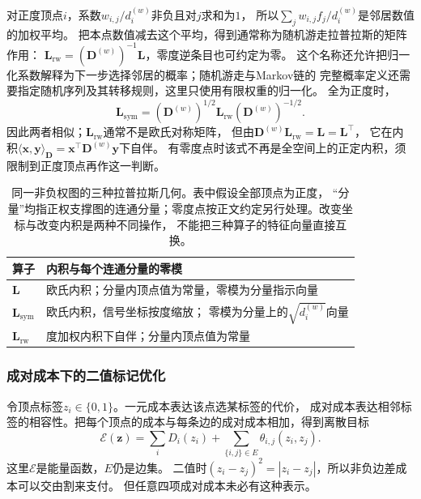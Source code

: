 对正度顶点\(i\)，系数\(w_{i,j}/d_i^{(w)}\)非负且对\(j\)求和为\(1\)，
所以\(\sum_j w_{i,j}f_j/d_i^{(w)}\)是邻居数值的加权平均。
把本点数值减去这个平均，得到通常称为随机游走拉普拉斯的矩阵作用：
\(\bm L_{\mathrm{rw}}=(\bm D^{(w)})^{-1}\bm L\)，零度逆条目也可约定为零。
这个名称还允许把归一化系数解释为下一步选择邻居的概率；随机游走与Markov链的
完整概率定义还需要指定随机序列及其转移规则，这里只使用有限权重的归一化。
全为正度时，
\[
  \bm L_{\mathrm{sym}}
  =(\bm D^{(w)})^{1/2}\bm L_{\mathrm{rw}}(\bm D^{(w)})^{-1/2}.
\]
因此两者相似；\(\bm L_{\mathrm{rw}}\)通常不是欧氏对称矩阵，
但由\(\bm D^{(w)}\bm L_{\mathrm{rw}}=\bm L=\bm L^\top\)，
它在内积\(\langle\bm x,\bm y\rangle_{\bm D}
=\bm x^\top\bm D^{(w)}\bm y\)下自伴。
有零度点时该式不再是全空间上的正定内积，须限制到正度顶点再作这一判断。

\begin{table}[htbp]
  \centering\small
  \begin{tabularx}{\linewidth}{@{}lX@{}}
    \toprule
    算子 & 内积与每个连通分量的零模\\
    \midrule
    \(\bm L\) & 欧氏内积；分量内顶点值为常量，零模为分量指示向量\\
    \(\bm L_{\mathrm{sym}}\) & 欧氏内积，信号坐标按度缩放；
      零模为分量上的\(\sqrt{d_i^{(w)}}\)向量\\
    \(\bm L_{\mathrm{rw}}\) & 度加权内积下自伴；分量内顶点值为常量\\
    \bottomrule
  \end{tabularx}
  \caption{同一非负权图的三种拉普拉斯几何。表中假设全部顶点为正度，
  “分量”均指正权支撑图的连通分量；零度点按正文约定另行处理。改变坐标与改变内积是两种不同操作，
  不能把三种算子的特征向量直接互换。}
  \label{tab:graph-theory-laplacian-geometries}
\end{table}

\subsubsection{成对成本下的二值标记优化}

令顶点标签\(z_i\in\{0,1\}\)。一元成本表达该点选某标签的代价，
成对成本表达相邻标签的相容性。把每个顶点的成本与每条边的成对成本相加，得到离散目标
\begin{equation}
  \mathcal E(\bm z)=\sum_iD_i(z_i)
  +\sum_{\{i,j\}\in E}\theta_{i,j}(z_i,z_j).
  \label{eq:graph-theory-binary-pairwise-energy}
\end{equation}
这里\(\mathcal E\)是能量函数，\(E\)仍是边集。
二值时\((z_i-z_j)^2=|z_i-z_j|\)，所以非负边差成本可以交由割来支付。
但任意四项成对成本未必有这种表示。

